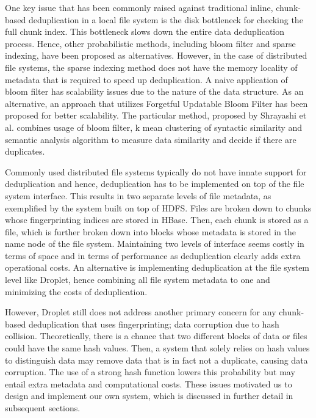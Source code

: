 \documentclass[11pt,twocolumn]{article}
\begin{document}
One key issue that has been commonly raised against traditional inline, chunk-based deduplication in a local file system is the disk bottleneck for checking the full chunk index.  This bottleneck slows down the entire data deduplication process. Hence, other probabilistic methods, including bloom filter and sparse indexing, have been proposed as alternatives\cite{Sparse}. However, in the case of distributed file systems, the sparse indexing method does not have the memory locality of metadata that is required to speed up deduplication. A naive application of bloom filter has scalability issues due to the nature of the data structure. As an alternative, an approach that utilizes Forgetful Updatable Bloom Filter has been proposed for better scalability\cite{Bloom}. The particular method, proposed by Shrayashi et al. combines usage of bloom filter, k mean clustering of syntactic similarity and semantic analysis algorithm to measure data similarity and decide if there are duplicates.

Commonly used distributed file systems typically do not have innate support for deduplication and hence, deduplication has to be implemented on top of the file system interface. This results in two separate levels of file metadata, as exemplified by the system built on top of HDFS. Files are broken down to chunks whose fingerprinting indices are stored in HBase. Then, each chunk is stored as a file, which is further broken down into blocks whose metadata is stored in the name node of the file system. Maintaining two levels of interface seems costly in terms of space and in terms of performance as deduplication clearly adds extra operational costs. An alternative is implementing deduplication at the file system level like Droplet, hence combining all file system metadata to one and minimizing the costs of deduplication. 

However, Droplet still does not address another primary concern for any chunk-based deduplication that uses fingerprinting; data corruption due to hash collision. Theoretically, there is a chance that two different blocks of data or files could have the same hash values. Then, a system that solely relies on hash values to distinguish data may remove data that is in fact not a duplicate, causing data corruption. The use of a strong hash function lowers this probability but may entail extra metadata and computational costs. These issues motivated us to design and implement our own system, which is discussed in further detail in subsequent sections.  
\end{document}
